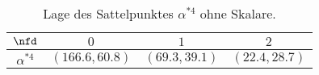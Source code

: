 \begin{table}
       \centering
       \begin{tabular}{c|ccc}
       \toprule \midrule
        $\nfd$ 		& $0$ & $1$ & $2$ \\
        \midrule
        $\alpha^{*4}$	& $(166.6, 60.8)$ & $(69.3, 39.1)$  & $(22.4, 28.7)$\\
        \midrule \bottomrule
       \end{tabular}
       \caption{Lage des Sattelpunktes $\alpha^{*4}$ ohne Skalare.}
       \label{tab:beta_QCDxdQCD:Sattelpunkt}
\end{table}